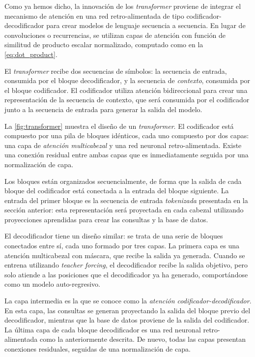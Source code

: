 Como ya hemos dicho, la innovación de los \textit{transformer} proviene de integrar el mecanismo de atención en una red retro-alimentada de tipo codificador-decodificador para crear modelos de lenguaje secuencia a secuencia. En lugar de convoluciones o recurrencias, se utilizan capas de atención con función de similitud de producto escalar normalizado, computado como en la \cref{eq:dot_product}.

El \textit{transformer} recibe dos secuencias de símbolos: la secuencia de entrada, consumida por el bloque decodificador, y la secuencia de \textit{contexto}, consumida por el bloque codificador. El codificador utiliza atención bidireccional para crear una representación de la secuencia de contexto, que será consumida por el codificador junto a la secuencia de entrada para generar la salida del modelo.

La \cref{fig:transformer} muestra el diseño  de un \textit{transformer}. El codificador está compuesto por una pila de bloques idénticos, cada uno compuesto por dos capas: una capa de \textit{atención multicabezal} y una red neuronal retro-alimentada. Existe una conexión residual entre ambas capas que es inmediatamente seguida por una normalización de capa.

Los bloques están organizados secuencialmente, de forma que la salida de cada bloque del codificador está conectada a la entrada del bloque siguiente. La entrada del primer bloque es la secuencia de entrada \textit{tokenizada} presentada en la sección anterior: esta representación será proyectada en cada cabezal utilizando proyecciones aprendidas para crear las consultas y la base de datos. 

El decodificador tiene un diseño similar: se trata de una serie de bloques conectados entre sí, cada uno formado por tres capas. La primera capa es una atención multicabezal con máscara, que recibe la salida ya generada. Cuando se entrena utilizando \textit{teacher forcing}, el decodificador recibe la salida objetivo, pero solo atiende a las posiciones que el decodificador ya ha generado, comportándose como un modelo auto-regresivo.

La capa intermedia es la que se conoce como la \textit{atención codificador-decodificador}. En esta capa, las consultas se generan proyectando la salida del bloque previo del decodificador, mientras que la base de datos proviene de la salida del codificador. La última capa de cada bloque decodificador es una red neuronal retro-alimentada como la anteriormente descrita. De nuevo, todas las capas presentan conexiones residuales, seguidas de una normalización de capa.

